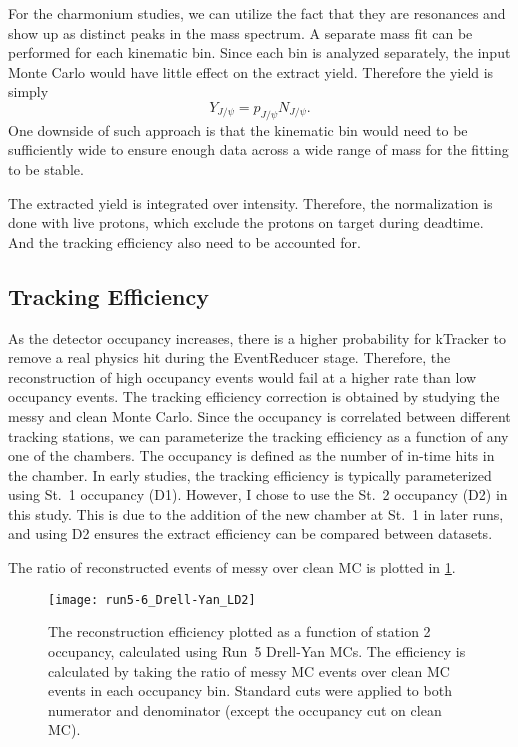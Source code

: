 \documentclass[../main.tex]{subfiles}
\begin{document}
For the charmonium studies, we can utilize the fact that they are resonances and show up as distinct peaks
in the mass spectrum. A separate mass fit can be performed for each kinematic bin. Since each bin is analyzed
separately, the input Monte Carlo would have little effect on the extract yield. Therefore the yield is simply
\begin{equation}
	Y_{J/\psi}= p_{J/\psi} N_{J/\psi}.
\end{equation}
One downside of such approach is that the kinematic bin would need to be sufficiently wide to ensure enough
data across a wide range of mass for the fitting to be stable.

The extracted yield is integrated over intensity. Therefore, the
normalization is done with live protons, which exclude the protons on target during deadtime. And the tracking
efficiency also need to be accounted for.

\subsection{Tracking Efficiency}
As the detector occupancy increases, there is a higher probability for kTracker to
remove a real physics hit during the EventReducer stage. Therefore, the reconstruction of high occupancy
events would fail at a higher rate than low occupancy events.
The tracking efficiency correction is obtained by studying the messy and clean Monte Carlo.
Since the occupancy
is correlated between different tracking stations, we can parameterize the tracking efficiency
as a function of any one of the chambers. The occupancy is defined as the number of
in-time hits in the chamber. In early studies, the tracking efficiency is
typically parameterized using St.~1 occupancy (D1).
However, I chose to use the St.~2 occupancy (D2) in this study. This
is due to the addition of the new chamber at St.~1 in later runs, and using D2 ensures the
extract efficiency can be compared between datasets.

The ratio of reconstructed events of messy over clean MC is plotted in \cref{fig:tracking efficiency}.
\begin{figure}[h!]
	\centering
	\texttt{[image: run5-6\_Drell-Yan\_LD2]}
	\caption{The reconstruction efficiency plotted as a function of station 2 occupancy, calculated using
		Run~5  Drell-Yan MCs.
		The efficiency is calculated by taking the ratio of messy MC events over clean MC events in each
		occupancy bin. Standard cuts were applied to both numerator and denominator
		(except the occupancy cut on clean MC).
	}
	\label{fig:tracking efficiency}
\end{figure}
\end{document}
